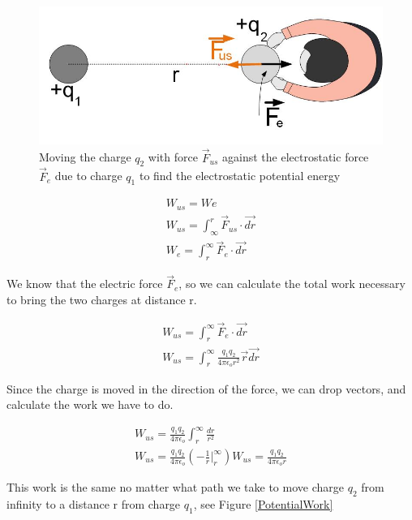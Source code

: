 \documentclass{ximera}
\begin{document}
\begin{figure}[htbp]
\begin{center}
\includegraphics[scale=0.5]{../jpg/Two_Static_Charges_Potential.jpg}
\end{center}
\caption{Moving the charge $q_2$ with force $\vec{F}_{us}$ against the electrostatic force $\vec{F}_e$ due to charge $q_1$ to find the electrostatic potential energy} \label{Potential1}
\end{figure}


\begin{eqnarray}
W_{us}=W{e} \\
W_{us}= \int_{\infty}^{r} \vec{F}_{us} \cdot \vec{dr} \\
W_{e}=  \int_{r}^{\infty} \vec{F}_{e} \cdot \vec{dr} 
\end{eqnarray}

We know that the electric force $\vec{F}_e$, so we can calculate the total work necessary to bring the two charges at distance r.

\begin{eqnarray}
W_{us}= \int_{r}^{\infty} \vec{F}_{e} \cdot \vec{dr} \\
W_{us}= \int_{r}^{\infty} \frac{q_1 q_2}{4 \pi \epsilon_o r^2} \vec{r} \vec{dr}
\end{eqnarray}

Since the charge is moved in the  direction of the force, we can drop vectors, and calculate the work we have to do.

\begin{eqnarray}
W_{us}= \frac{q_1 q_2}{4 \pi \epsilon_o} \int_{r}^{\infty} \frac{dr}{r^2} \\
W_{us}=  \frac{q_1 q_2}{4 \pi \epsilon_o} (-\frac{1}{r}\Big|_{r}^{\infty})
W_{us}=  \frac{q_1 q_2}{4 \pi \epsilon_o r} \label{WorkPoinCharge}
\end{eqnarray}

This work is the same no matter what path we take to move charge $q_2$ from infinity to a distance r from charge $q_1$, see Figure \ref{PotentialWork}
\end{document}
